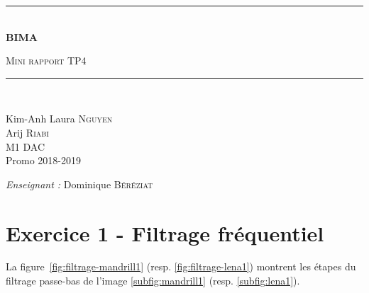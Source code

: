 \documentclass[a4paper]{article}
\newcommand{\HRule}{\rule{\linewidth}{0.5mm}}
\newcommand{\figref}[1]{figure~\ref{#1}}
\begin{document}
\begin{titlepage}
  \begin{center}


      \vspace{4cm}
    \HRule \\[0.4cm]
    { \huge \bfseries BIMA\\[0.4cm] }

      \textsc{\LARGE Mini rapport TP4}\\[0.4cm]

    \HRule \\[0.8cm]

    \begin{minipage}{0.4\textwidth}
      \begin{flushleft} \large
        Kim-Anh Laura \textsc{Nguyen}\\
        \large
        Arij \textsc{Riabi}\\
        M1 DAC\\
        Promo 2018-2019 \\
      \end{flushleft}
    \end{minipage}
    \begin{minipage}{0.5\textwidth}
      \begin{flushright} \large
        \emph{Enseignant :} Dominique \textsc{Béréziat}\\
      \end{flushright}
    \end{minipage}

      \vspace{2cm}

  \end{center}
\end{titlepage}

\newpage

\section*{Exercice 1 - Filtrage fréquentiel}

La \figref{fig:filtrage-mandrill1} (resp. \ref{fig:filtrage-lena1}) montrent les
étapes du filtrage passe-bas de l'image \ref{subfig:mandrill1} (resp.
\ref{subfig:lena1}).
\end{document}
